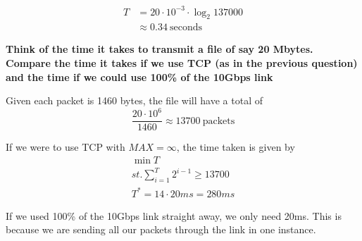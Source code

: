 \documentclass[]{article}
\newcommand{\e}{&=}
\begin{document}
\begin{align*}
T \e 20 \cdot 10^{-3} \cdot \log_2 137000 \\
	&\approx 0.34\ \text{seconds}
\end{align*}

\textbf{Think of the time it takes to transmit a file of say 20 Mbytes. Compare the time it takes if we use TCP (as in the previous question) and the time if we could use 100\% of the 10Gbps link}

Given each packet is 1460 bytes, the file will have a total of 
\[
\frac{20 \cdot 10^6 }{1460} \approx 13700\ \text{packets} 
\]

If we were to use TCP with $MAX = \infty$, the time taken is given by
\begin{gather*}
\min T \\
st. \sum_{i=1}^{T} 2^{i-1} \geq 13700 \\
T^* = 14 \cdot 20ms = 280ms
\end{gather*}

If we used 100\% of the 10Gbps link straight away, we only need 20ms. This is because we are sending all our packets through the link in one instance.
\end{document}
